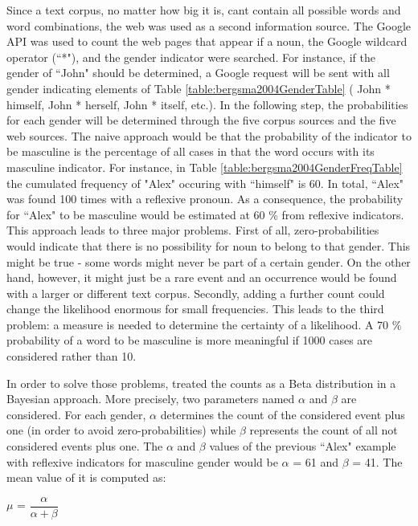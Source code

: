 Since a text corpus, no matter how big it is, cant contain all possible words and word combinations, the web was used as a second information source. The Google API was used to count the web pages that appear if a noun, the Google wildcard operator (“*"), and the gender indicator were searched. For instance, if the gender of “John" should be determined, a Google request will be sent with all gender indicating elements of Table \ref{table:bergsma2004GenderTable} ( John * himself, John * herself, John * itself, etc.).
In the following step, the probabilities for each gender will be determined through the five corpus sources and the five web sources. The naive approach would be that the probability of the indicator to be masculine is the percentage of all cases in that the word occurs with its masculine indicator. For instance, in Table \ref{table:bergsma2004GenderFreqTable} the cumulated frequency of "Alex" occuring with “himself" is 60. In total, “Alex" was found 100 times with a reflexive pronoun. As a consequence, the probability for “Alex" to be masculine would be estimated at 60 \% from reflexive indicators.
This approach leads to three major problems. First of all, zero-probabilities would indicate that there is no possibility for noun to belong to that gender. This might be true - some words might never be part of a certain gender. On the other hand, however, it might just be a rare event and an occurrence would be found with a larger or different text corpus. Secondly, adding a further count could change the likelihood enormous for small frequencies. This leads to the third problem: a measure is needed to determine the certainty of a likelihood. A 70 \% probability of a word to be masculine is more meaningful if 1000 cases are considered rather than 10. 
 
In order to solve those problems, \cite{bergsma2005automatic} treated the counts as a Beta distribution in a Bayesian approach. More precisely, two parameters named $\alpha$ and $\beta$ are considered. For each gender, $\alpha$ determines the count of the considered event plus one (in order to avoid zero-probabilities) while $\beta$ represents the count of all not considered events plus one. The $\alpha$ and $\beta$ values of the previous “Alex" example with reflexive indicators for masculine gender would be $\alpha$ = 61 and $\beta$ = 41. The mean value of it is computed as:
\begin{center}
	 $\mu$ =  $\dfrac{\alpha }{\alpha + \beta}$  
\end{center}

